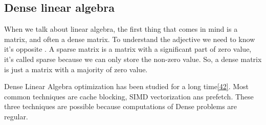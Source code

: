 \subsection{Dense linear algebra}

When we talk about linear algebra, the first thing that comes in mind is a matrix, and often a dense matrix.
%
To understand the adjective  we need to know it's opposite .
%
A sparse matrix is a matrix with a significant part of zero value, it's called sparse because we can only store the non-zero value.
%
So, a dense matrix is just a matrix with a majority of zero value.


Dense Linear Algebra optimization has been studied for a long time\ref{42}.
Most common techniques are cache blocking, SIMD vectorization ans prefetch.
These three techniques are possible because computations of Dense problems
are regular.

